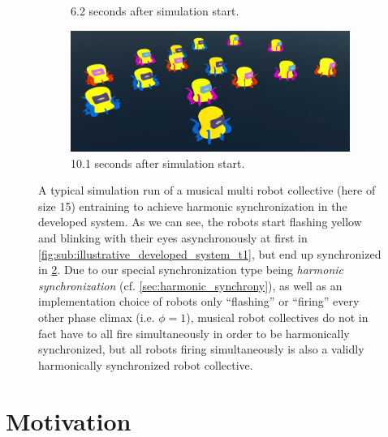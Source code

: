 \begin{figure}[!ht]
\begin{subfigure}[b]{0.495\textwidth}
	\caption{6.2 seconds after simulation start.}
	\label{fig:sub:illustrative_developed_system_t3}
  \end{subfigure}
  \begin{subfigure}[b]{0.495\textwidth}
	\centering\captionsetup{width=.9\linewidth}%
	\includegraphics[width=\textwidth]{Assets/DocSegments/Chapters/Introduction/Figures/illustrative_system_result_figure_s10p1.png}
	\caption{10.1 seconds after simulation start.}
	\label{fig:sub:illustrative_developed_system_t4}
  \end{subfigure}
  \caption{A typical simulation run of a musical multi robot collective (here of size 15) entraining to achieve harmonic synchronization in the developed system. As we can see\protect\footnotemark, the robots start flashing yellow and blinking with their eyes asynchronously at first in \ref{fig:sub:illustrative_developed_system_t1}, but end up synchronized in \ref{fig:sub:illustrative_developed_system_t4}. Due to our special synchronization type being \textit{harmonic synchronization} (cf. \ref{sec:harmonic_synchrony}), as well as an implementation choice of robots only ``flashing'' or ``firing'' every other phase climax (i.e. $\phi=1$), musical robot collectives do not in fact have to all fire simultaneously in order to be harmonically synchronized, but all robots firing simultaneously is also a validly harmonically synchronized robot collective.}
  \label{fig:illustrative_developed_system}
\end{figure}





\section{Motivation}


